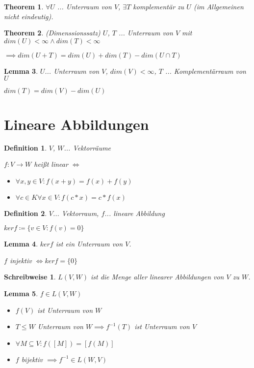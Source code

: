 \documentclass[twocolumn]{article}
\newtheorem{theorem}{Theorem}[section]
\newtheorem{lemma}[theorem]{Lemma}
\newtheorem{definition}{Definition}[section]
\newtheorem*{schreibweise}{Schreibweise}
\newcommand*{\logeq}{\Leftrightarrow}
\begin{document}
\begin{theorem}
	$\forall U$ ... Unterraum von $V$, $\exists T$ komplementär zu $U$ (im Allgemeinen nicht eindeutig).
\end{theorem}

\begin{theorem}(Dimenssionssatz)
	$U$, $T$ ... Unterraum von $V$ mit $dim(U) < \infty \land dim(T) < \infty$
	
	$\implies dim(U+T)=dim(U)+dim(T)-dim(U\cap T)$
\end{theorem}

\begin{lemma}
	$U$... Unterraum von $V$, $dim(V) < \infty$, $T$ ... Komplementärraum von $U$
	
	$dim(T)=dim(V)-dim(U)$
\end{lemma}

\section{Lineare Abbildungen}

\begin{definition}
	$V$, $W$... Vektorräume
	
	$f:V\rightarrow W$ heißt linear $\logeq$
	
	\begin{itemize}
		\item $\forall x,y \in V : f(x+y)=f(x)+f(y)$
		\item $\forall c \in K \forall x \in V : f(c*x)=c*f(x)$
	\end{itemize}
\end{definition}

\begin{definition}
	$V$... Vektorraum, $f$... lineare Abbildung
	
	$kerf \coloneqq \{v \in V : f(v) = 0\}$
\end{definition}

\begin{lemma}
	$kerf$ ist ein Unterraum von $V$.
	
	$f$ injektiv $\logeq kerf=\{0\}$
\end{lemma}

\begin{schreibweise}
	$L(V,W)$ ist die Menge aller linearer Abbildungen von $V$ zu $W$.
\end{schreibweise}

\begin{lemma}
	$f \in L(V,W)$
	
	\begin{itemize}
		\item $f(V)$ ist Unterraum von $W$
		\item $T \leq W$ Unterraum von $W \implies f^{-1}(T)$ ist Unterraum von $V$
		\item $\forall M \subseteq V : f([M]) = [f(M)]$
		\item $f$ bijektiv $\implies f^{-1} \in L(W,V)$
	\end{itemize}
\end{lemma}
\end{document}
